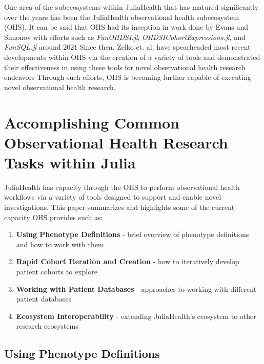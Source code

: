 \documentclass{juliacon}
\begin{document}
One area of the subecosystems within JuliaHealth that has matured significantly over the years has been the JuliaHealth observational health subecosystem (OHS).
It can be said that OHS had its inception in work done by Evans and Simonov with efforts such as \textit{FunOHDSI.jl}, \textit{OHDSICohortExpressions.jl}, and \textit{FunSQL.jl} around $2021$ \cite{kirill_simonov_2023_7705325}
Since then, Zelko et. al. have spearheaded most recent developments within OHS via the creation of a variety of tools and demonstrated their effectiveness in using these tools for novel observational health research endeavors \cite{zelko2022pilot}
Through such efforts, OHS is becoming further capable of executing novel observational health research. 

\section{Accomplishing Common Observational Health Research Tasks within Julia}

JuliaHealth has capacity through the OHS to perform observational health workflows via a variety of tools designed to support and enable novel investigations.
This paper summarizes and highlights some of the current capacity OHS provides such as:

\begin{enumerate}
\item \textbf{Using Phenotype Definitions} - brief overview of phenotype definitions and how to work with them
\item \textbf{Rapid Cohort Iteration and Creation} - how to iteratively develop patient cohorts to explore
\item \textbf{Working with Patient Databases} - approaches to working with different patient databases
\item \textbf{Ecosystem Interoperability} - extending JuliaHealth's ecosystem to other research ecosystems
\end{enumerate}

\subsection{Using Phenotype Definitions}
\end{document}

